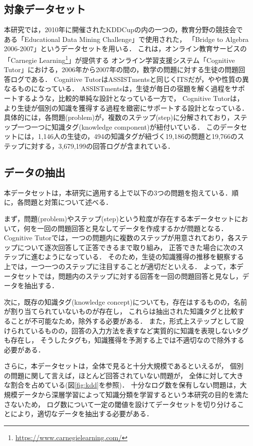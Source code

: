 \subsection{対象データセット}
本研究では，2010年に開催されたKDDCupの内の一つの，教育分野の競技会である「Educational Data Mining Challenge」で使用された，
「Bridge to Algebra 2006-2007」\cite{kddcup2010bridge2006}というデータセットを用いる．
これは，オンライン教育サービスの「Carnegie Learning\footnote{\url{https://www.carnegielearning.com/}}」が提供する
オンライン学習支援システム「Cognitive Tutor」における，2006年から2007年の間の，数学の問題に対する生徒の問題回答ログである．%
Cognitive TutorはASSISTmentsと同じくITSだが，やや性質の異なるものになっている．
ASSISTmentsは，生徒が毎日の宿題を解く過程をサポートするような，比較的単純な設計となっている一方で，
Cognitive Tutorは，より生徒が個別の知識を獲得する過程を緻密にサポートする設計となっている．
具体的には，各問題(problem)が，複数のステップ(step)に分解されており，ステップ一つ一つに知識タグ(knowledge component)が紐付いている．
このデータセットには，1,146人の生徒の，494の知識タグが紐づく19,186の問題と19,766のステップに対する，3,679,199の回答ログが含まれている．


\subsection{データの抽出}
本データセットは，本研究に適用する上で以下の3つの問題を抱えている．順に，各問題と対策について述べる．

まず，問題(problem)やステップ(step)という粒度が存在する本データセットにおいて，何を一回の問題回答と見なしてデータを作成するかが問題となる．
Cognitive Tutorでは，一つの問題内に複数のステップが用意されており，各ステップについて逐次回答して正答できるまで取り組み，
正答できた場合に次のステップに進むようになっている．
そのため，生徒の知識獲得の推移を観察する上では，一つ一つのステップに注目することが適切だといえる．
よって，本データセットでは，問題内のステップに対する回答を一回の問題回答と見なし，データを抽出する．

次に，既存の知識タグ(knowledge concept)についても，存在はするものの，名前が割り当てられていないものが存在し，
これらは抽出された知識タグと比較することが不可能なため，除外する必要がある．
また，形式上ステップとして設けられているものの，回答の入力方法を表すなど実質的に知識を表現しないタグも存在し，
そうしたタグも，知識獲得を予測する上では不適切なので除外する必要がある．
 
さらに，本データセットは，全体で見ると十分大規模であるといえるが，
個別の問題に関して言えば，ほとんど回答されていない問題が，
全体に対して大きな割合を占めている(図\ref{fig:kdd}を参照)．
十分なログ数を保有しない問題は，大規模データから深層学習によって知識分類を学習するという本研究の目的を満たさないため，
ログ数について一定の閾値を設けてデータセットを切り分けることにより，適切なデータを抽出する必要がある．



